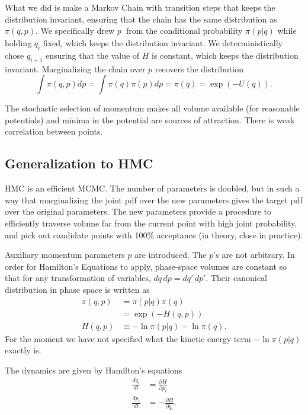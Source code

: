 \documentclass[11pt, oneside]{article}   	%
\begin{document}
What we did is make a Markov Chain with transition steps that keeps the distribution invariant, ensuring that the
chain has the same distribution as $\pi(q,p)$.  We specifically drew $p_.$ from the conditional probability
$\pi(p|q)$ while holding $q_i$ fixed, which keeps the distribution invariant.  We deterministically chose
$q_{i+1}$ ensuring that the value of $H$ is constant, which keeps the distribution invariant.
Marginalizing the chain over $p$ recovers the distribution
\begin{equation}
\int \pi(q,p) dp=\int \pi(q)\pi(p) dp = \pi(q) =\exp{\left(-U(q)\right)}.
\end{equation}

The stochastic selection of momentum makes all volume available (for reasonable potentials) and minima
in the potential are sources of attraction.  There is weak correlation between points.

\subsection{Generalization to HMC}

HMC is an efficient MCMC.  The number of parameters is doubled, but
in such a way that marginalizing the joint pdf over the new parameters gives
the target pdf over the original parameters.  The new parameters provide
a procedure to efficiently traverse volume  far
from the current point with high joint probability,
and pick out candidate points with 100\% acceptance
(in theory, close in practice).

Auxiliary momentum parameters $p$ are introduced.  The $p$'s are not arbitrary.
In order for Hamilton's Equations to apply, phase-space volumes are constant so that for any transformation
of variables, $dq\,dp = dq'\,dp'$. 
Their canonical distribution in phase space is written as
\begin{align}
\pi(q,p) & = \pi(p|q) \pi(q)\\
& = \exp{\left(-H(q,p)\right)}\\
H(q,p) & \equiv -\ln{\pi(p|q)}  -\ln{\pi(q)}.
\end{align}
For the moment we have not specified what the kinetic energy term $-\ln{\pi(p|q)}$ exactly is.

The dynamics are given by Hamilton's equations
\begin{align}
\frac{dq_i}{dt} & = \frac{\partial H}{\partial p_i} \\
\frac{dp_i}{dt} & = -\frac{\partial H}{\partial q_i}.
\end{align}
\end{document}

